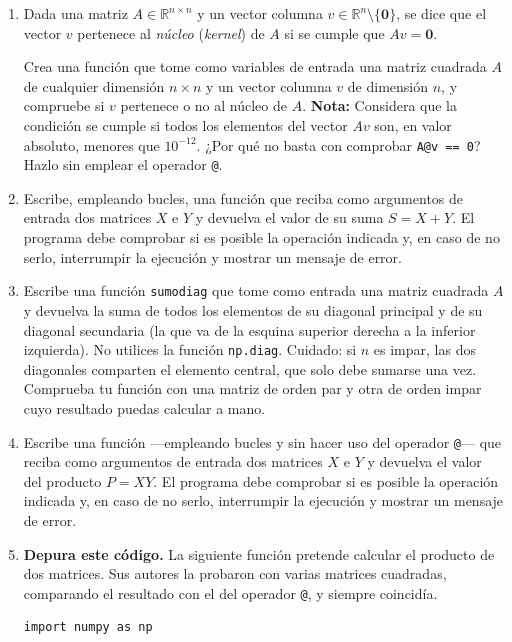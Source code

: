 \begin{enumerate}
\item Dada una matriz $A \in \mathbb{R}^{n\times n}$ y un vector columna $v \in \mathbb{R}^n\setminus\{\mathbf{0}\}$, se dice que el vector $v$ pertenece al \emph{núcleo} (\emph{kernel}) de $A$ si se cumple que $Av =\mathbf{0}$.

Crea una función que tome como variables de entrada una matriz cuadrada $A$ de cualquier dimensión $n\times n$ y un vector columna $v$ de dimensión $n$, y compruebe si $v$ pertenece o no al núcleo de $A$. \textbf{Nota:} Considera que la condición se cumple si todos los elementos del vector $Av$ son, en valor absoluto, menores que $10^{-12}$. ¿Por qué no basta con comprobar \texttt{A@v == 0}? Hazlo sin emplear el operador \texttt{@}.

\item Escribe, empleando bucles, una función que reciba como argumentos de entrada dos matrices $X$ e $Y$ y devuelva el valor de su suma $S=X+Y$. El programa debe comprobar si es posible la operación indicada y, en caso de no serlo, interrumpir la ejecución y mostrar un mensaje de error.

\item Escribe una función \texttt{sumodiag} que tome como entrada una matriz cuadrada $A$ y devuelva la suma de todos los elementos de su diagonal principal y de su diagonal secundaria (la que va de la esquina superior derecha a la inferior izquierda). No utilices la función \texttt{np.diag}. Cuidado: si $n$ es impar, las dos diagonales comparten el elemento central, que solo debe sumarse una vez. Comprueba tu función con una matriz de orden par y otra de orden impar cuyo resultado puedas calcular a mano.

\item Escribe una función ---empleando bucles y sin hacer uso del operador \texttt{@}--- que reciba como argumentos de entrada dos matrices $X$ e $Y$ y devuelva el valor del producto $P=XY$. El programa debe comprobar si es posible la operación indicada y, en caso de no serlo, interrumpir la ejecución y mostrar un mensaje de error.

\item \textbf{Depura este código.} La siguiente función pretende calcular el producto de dos matrices. Sus autores la probaron con varias matrices cuadradas, comparando el resultado con el del operador \texttt{@}, y siempre coincidía.
\begin{verbatim}
import numpy as np


\end{verbatim}
\end{enumerate}
